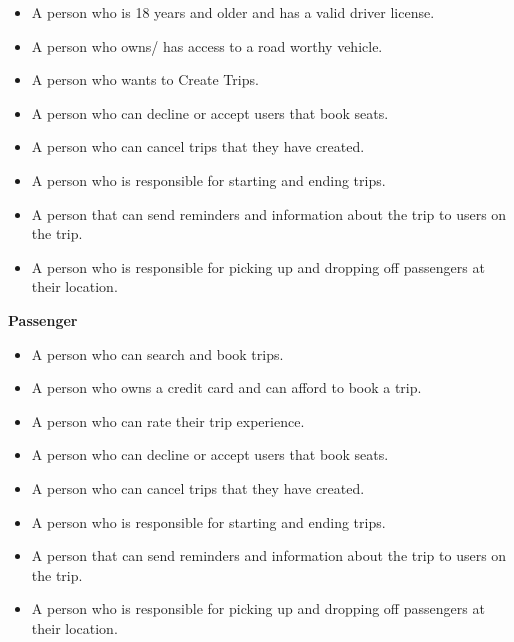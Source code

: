 \documentclass[hidelinks, 12pt, a4paper]{article}
\begin{document}
        \begin{itemize}

            \item A person who is 18 years and older and has a valid driver license.
            \item A person who owns/ has access to a road worthy vehicle.
            \item A person who wants to Create Trips.
            \item A person who can decline or accept users that book seats.
            \item A person who can cancel trips that they have created.
            \item A person who is responsible for starting and ending trips.
            \item A person that can send reminders and information about the trip to users on the trip.
            \item  A person who is responsible for picking up and dropping off passengers at their location.
        \end{itemize}
        \vspace{0.5cm}
        
            \large{ \textbf{Passenger} }
    
        \begin{itemize}

            \item A person who can search and book trips.
            \item A person who owns a credit card and can afford to book a trip.
            \item A person who can rate their trip experience.
            \item A person who can decline or accept users that book seats.
            \item A person who can cancel trips that they have created.
            \item A person who is responsible for starting and ending trips.
            \item A person that can send reminders and information about the trip to users on the trip.
            \item  A person who is responsible for picking up and dropping off passengers at their location.
        \end{itemize}

    \newpage
\end{document}
